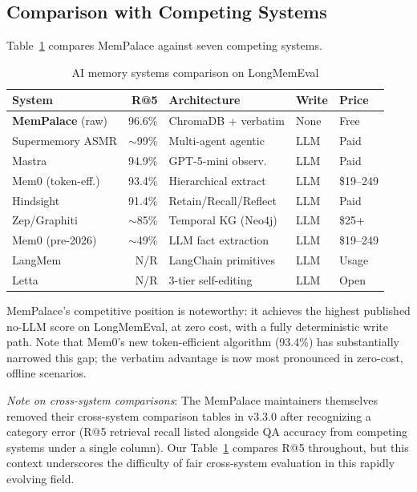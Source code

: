 \documentclass[twoside,11pt]{article}
\begin{document}
\subsection{Comparison with Competing Systems}

Table~\ref{tab:comparison} compares MemPalace against seven competing systems.

\begin{table}[t]
\centering
\caption{AI memory systems comparison on LongMemEval}
\label{tab:comparison}
\small
\begin{tabular}{@{}lrlll@{}}
\toprule
\textbf{System} & \textbf{R@5} & \textbf{Architecture} & \textbf{Write} & \textbf{Price} \\
\midrule
\textbf{MemPalace} (raw) & 96.6\% & ChromaDB + verbatim  & None  & Free \\
Supermemory ASMR   & $\sim$99\%  & Multi-agent agentic  & LLM   & Paid \\
Mastra             & 94.9\%      & GPT-5-mini observ.   & LLM   & Paid \\
Mem0 (token-eff.)  & 93.4\%      & Hierarchical extract & LLM   & \$19--249 \\
Hindsight          & 91.4\%      & Retain/Recall/Reflect& LLM   & Paid \\
Zep/Graphiti       & $\sim$85\%  & Temporal KG (Neo4j)  & LLM   & \$25+ \\
Mem0 (pre-2026)    & $\sim$49\%  & LLM fact extraction  & LLM   & \$19--249 \\
LangMem            & N/R         & LangChain primitives & LLM   & Usage \\
Letta              & N/R         & 3-tier self-editing  & LLM   & Open \\
\bottomrule
\end{tabular}
\end{table}

MemPalace's competitive position is noteworthy: it achieves the highest
published no-LLM score on LongMemEval, at zero cost, with a fully
deterministic write path.  Note that Mem0's new token-efficient algorithm
(93.4\%) has substantially narrowed this gap; the verbatim advantage is now
most pronounced in zero-cost, offline scenarios.

\textit{Note on cross-system comparisons}: The MemPalace maintainers
themselves removed their cross-system comparison tables in v3.3.0 after
recognizing a category error (R@5 retrieval recall listed alongside QA
accuracy from competing systems under a single column).  Our
Table~\ref{tab:comparison} compares R@5 throughout, but this context
underscores the difficulty of fair cross-system evaluation in this rapidly
evolving field.
\end{document}
